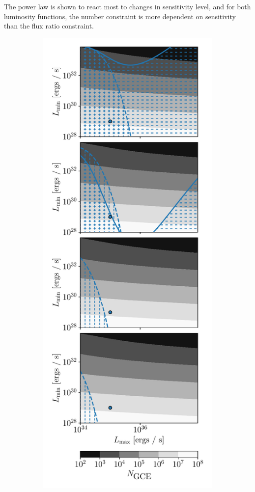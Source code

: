\documentclass[a4paper,11pt]{article}
\newcommand{\comment}[1]{\emph{\color{red}{#1}}}
\begin{document}
\comment{It's difficult to draw conclusions from these plots because if you increase sensitivity, the number of observed sources will obviously change. Maybe I should be doing a different kind of analysis? Or figure out a better way to phrase things} The power law is shown to react most to changes in sensitivity level, and for both luminosity functions, the number constraint is more dependent on sensitivity than the flux ratio constraint.

\begin{figure}
    \centering
    \begin{subfigure}[b]{0.32\textwidth}
        \includegraphics[width=\textwidth]{figs/power-law-sensitivity.pdf}

\end{subfigure}
\end{figure}
\end{document}
